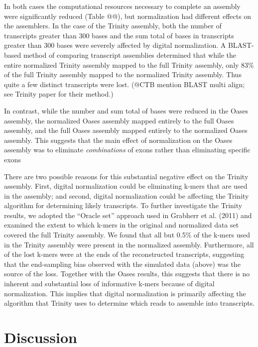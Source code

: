 \documentclass[10pt]{article}
\begin{document}
In both cases the computational resources necessary to complete an
assembly were significantly reduced (Table @@), but normalization had different
effects on the assemblers.  In the case of the Trinity
assembly, both the number of transcripts greater than 300 bases and
the sum total of bases in transcripts greater than 300 bases were
severely affected by digital normalization.  A BLAST-based method of
comparing transcript assemblies determined that while the entire normalized
Trinity assembly mapped to the full Trinity assembly, only 83\% of the
full Trinity assembly mapped to the normalized Trinity assembly. Thus quite
a few distinct transcripts were lost.  (@CTB mention BLAST multi align; see
Trinity paper for their method.)

In contrast, while the number and sum total of bases were reduced in
the Oases assembly, the normalized Oases assembly mapped entirely to the full
Oases assembly, and the full Oases assembly mapped entirely to the normalized
Oases assembly.  This suggests that the main effect of
normalization on the Oases assembly was to eliminate {\em combinations} of
exons rather than eliminating specific exons

There are two possible reasons for this substantial negative effect on
the Trinity assembly.  First, digital normalization could be
eliminating k-mers that are used in the assembly; and second, digital
normalization could be affecting the Trinity algorithm for determining
likely transcripts.  To further investigate the Trinity results, we
adopted the ``Oracle set'' approach used in Grabherr et al. (2011) and
examined the extent to which k-mers in the original and normalized
data set covered the full Trinity assembly.  We found that all but
0.5\% of the k-mers used in the Trinity assembly were present in the
normalized assembly.  Furthermore, all of the lost k-mers were at the
ends of the reconstructed transcripts, suggesting that the
end-sampling bias observed with the simulated data (above) was the
source of the loss.  Together with the Oases results, this suggests
that there is no inherent and substantial loss of informative k-mers
because of digital normalization.  This implies that digital
normalization is primarily affecting the algorithm that Trinity uses
to determine which reads to assemble into transcripts.


\section*{Discussion}
\end{document}
